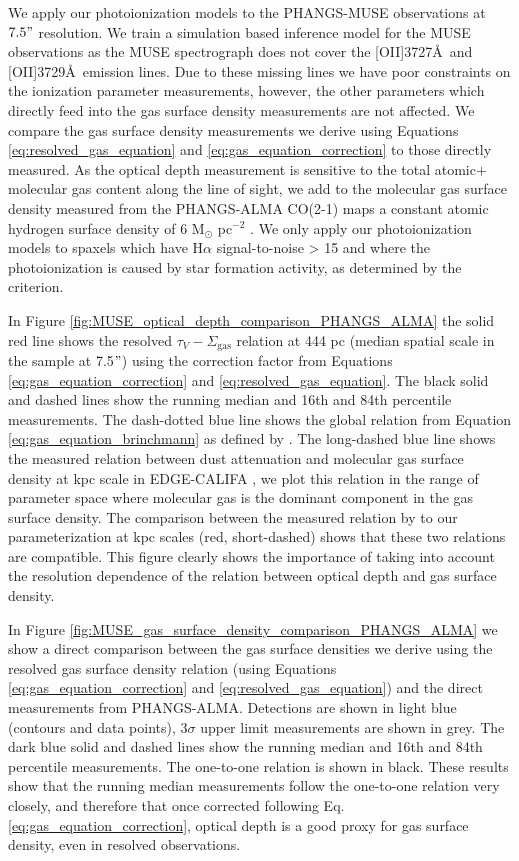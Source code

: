 \documentclass[fleqn,usenatbib]{mnras}
\begin{document}
We apply our photoionization models to the PHANGS-MUSE observations at $7.5"$ resolution. We train a simulation based inference model for the MUSE observations as the MUSE spectrograph does not cover the [OII]3727\AA\ and [OII]3729\AA\ emission lines. Due to these missing lines we have poor constraints on the ionization parameter measurements, however, the other parameters which directly feed into the gas surface density measurements are not affected. We compare the gas surface density measurements we derive using Equations \ref{eq:resolved_gas_equation} and \ref{eq:gas_equation_correction} to those directly measured. As the optical depth measurement is sensitive to the total atomic$+$molecular gas content along the line of sight, we add to the molecular gas surface density measured from the PHANGS-ALMA CO(2-1) maps \citep{leroy2021} a constant atomic hydrogen surface density of 6 M$_{\odot}$ pc$^{-2}$ \citep{barrera-ballesteros2020}. We only apply our photoionization models to spaxels which have H$\alpha$ signal-to-noise > 15 and where the photoionization is caused by star formation activity, as determined by the \cite{kauffmann2003} criterion. 

In Figure \ref{fig:MUSE_optical_depth_comparison_PHANGS_ALMA} the solid red line shows the resolved $\tau_V-\Sigma_{\textrm{gas}}$ relation at 444 pc (median spatial scale in the sample at 7.5$"$) using the correction factor from Equations \ref{eq:gas_equation_correction} and \ref{eq:resolved_gas_equation}. The black solid and dashed lines show the running median and 16th and 84th percentile measurements. The dash-dotted blue line shows the global relation from Equation \ref{eq:gas_equation_brinchmann} as defined by \cite{brinchmann2013}. The long-dashed blue line shows the measured relation between dust attenuation and molecular gas surface density at kpc scale in EDGE-CALIFA \citep[][]{barrera-ballesteros2021}, we plot this relation in the range of parameter space where molecular gas is the dominant component in the gas surface density. The comparison between the measured relation by \cite{barrera-ballesteros2021} to our parameterization at kpc scales (red, short-dashed) shows that these two relations are compatible. This figure clearly shows the importance of taking into account the resolution dependence of the relation between optical depth and gas surface density. 

In Figure \ref{fig:MUSE_gas_surface_density_comparison_PHANGS_ALMA} we show a direct comparison between the gas surface densities we derive using the resolved gas surface density relation (using Equations \ref{eq:gas_equation_correction} and \ref{eq:resolved_gas_equation}) and the direct measurements from PHANGS-ALMA. Detections are shown in light blue (contours and data points), 3$\sigma$ upper limit measurements are shown in grey. The dark blue solid and dashed lines show the running median and 16th and 84th percentile measurements. The one-to-one relation is shown in black. These results show that the running median measurements follow the one-to-one relation very closely, and therefore that once corrected following Eq. \ref{eq:gas_equation_correction}, optical depth is a good proxy for gas surface density, even in resolved observations. 
\end{document}
